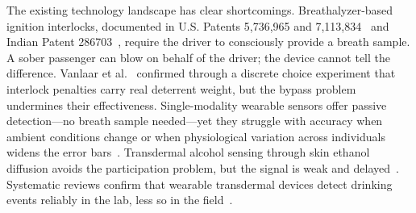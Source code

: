 \documentclass[HARVARD,Times2COL]{WileyNJDv5} %
\providecommand{\DIFadd}[1]{{\protect\color{red} #1}} %
\providecommand{\DIFaddbegin}{} %
\providecommand{\DIFaddend}{} %
\providecommand{\DIFdelbegin}{} %
\providecommand{\DIFdelend}{} %
\providecommand{\DIFscaledelfig}{0.5}
\newlength{\DIFdelgraphicswidth} %
\newlength{\DIFdelgraphicsheight} %
\providecommand{\DIFaddincludegraphics}[2][]{{\color{blue}\fbox{\DIFOincludegraphics[#1]{#2}}}} %
\providecommand{\DIFdelincludegraphics}[2][]{%
\sbox{\DIFdelgraphicsbox}{\DIFOincludegraphics[#1]{#2}}%
\settoboxwidth{\DIFdelgraphicswidth}{\DIFdelgraphicsbox} %
\settoboxtotalheight{\DIFdelgraphicsheight}{\DIFdelgraphicsbox} %
\scalebox{\DIFscaledelfig}{%
\parbox[b]{\DIFdelgraphicswidth}{\usebox{\DIFdelgraphicsbox}\\[-\baselineskip] \rule{\DIFdelgraphicswidth}{0em}}\llap{\resizebox{\DIFdelgraphicswidth}{\DIFdelgraphicsheight}{%
\setlength{\unitlength}{\DIFdelgraphicswidth}%
\begin{picture}(1,1)%
\thicklines\linethickness{2pt} %
{\color[rgb]{1,0,0}\put(0,0){\framebox(1,1){}}}%
{\color[rgb]{1,0,0}\put(0,0){\line( 1,1){1}}}%
{\color[rgb]{1,0,0}\put(0,1){\line(1,-1){1}}}%
\end{picture}%
}\hspace*{3pt}}} %
} %
\DeclareRobustCommand{\DIFaddbegin}{\DIFOaddbegin \let\includegraphics\DIFaddincludegraphics} %
\DeclareRobustCommand{\DIFaddend}{\DIFOaddend \let\includegraphics\DIFOincludegraphics} %
\DeclareRobustCommand{\DIFdelbegin}{\DIFOdelbegin \let\includegraphics\DIFdelincludegraphics} %
\DeclareRobustCommand{\DIFdelend}{\DIFOaddend \let\includegraphics\DIFOincludegraphics} %
\begin{document}
\DIFdelbegin %
\DIFdelend \DIFaddbegin \DIFadd{The existing technology landscape has clear shortcomings. Breathalyzer-based ignition interlocks, documented in U.S. Patents 5,736,965 and 7,113,834~\citep{uspat5736965, uspat7113834} and Indian Patent 286703~\citep{inpat286703}, require the driver to consciously provide a breath sample. A sober passenger can blow on behalf of the driver; the device cannot tell the difference. Vanlaar et al.~\citep{interlock2024} confirmed through a discrete choice experiment that interlock penalties carry real deterrent weight, but the bypass problem undermines their effectiveness. Single-modality wearable sensors offer passive detection---no breath sample needed---yet they struggle with accuracy when ambient conditions change or when physiological variation across individuals widens the error bars~\citep{bush2024development}. Transdermal alcohol sensing through skin ethanol diffusion avoids the participation problem, but the signal is weak and delayed~\citep{fairbairn2021, fairbairn2025}. Systematic reviews confirm that wearable transdermal devices detect drinking events reliably in the lab, less so in the field~\citep{wang2022jmir, tay2023}.
}\DIFaddend 
\end{document}
